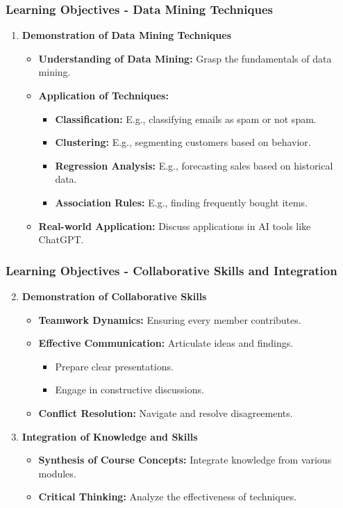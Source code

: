 \documentclass[aspectratio=169]{beamer}
\begin{document}
\begin{frame}[fragile]
    \frametitle{Learning Objectives - Data Mining Techniques}
    \begin{enumerate}
        \item \textbf{Demonstration of Data Mining Techniques}
        \begin{itemize}
            \item \textbf{Understanding of Data Mining:} Grasp the fundamentals of data mining.
            \item \textbf{Application of Techniques:}
            \begin{itemize}
                \item \textbf{Classification:} E.g., classifying emails as spam or not spam.
                \item \textbf{Clustering:} E.g., segmenting customers based on behavior.
                \item \textbf{Regression Analysis:} E.g., forecasting sales based on historical data.
                \item \textbf{Association Rules:} E.g., finding frequently bought items.
            \end{itemize}
            \item \textbf{Real-world Application:} Discuss applications in AI tools like ChatGPT.
        \end{itemize}
    \end{enumerate}
\end{frame}

\begin{frame}[fragile]
    \frametitle{Learning Objectives - Collaborative Skills and Integration}
    \begin{enumerate}
        \setcounter{enumi}{1}
        \item \textbf{Demonstration of Collaborative Skills}
        \begin{itemize}
            \item \textbf{Teamwork Dynamics:} Ensuring every member contributes.
            \item \textbf{Effective Communication:} Articulate ideas and findings.
            \begin{itemize}
                \item Prepare clear presentations.
                \item Engage in constructive discussions.
            \end{itemize}
            \item \textbf{Conflict Resolution:} Navigate and resolve disagreements.
        \end{itemize}
        \item \textbf{Integration of Knowledge and Skills}
        \begin{itemize}
            \item \textbf{Synthesis of Course Concepts:} Integrate knowledge from various modules.
            \item \textbf{Critical Thinking:} Analyze the effectiveness of techniques.
        \end{itemize}
    \end{enumerate}
\end{frame}
\end{document}
